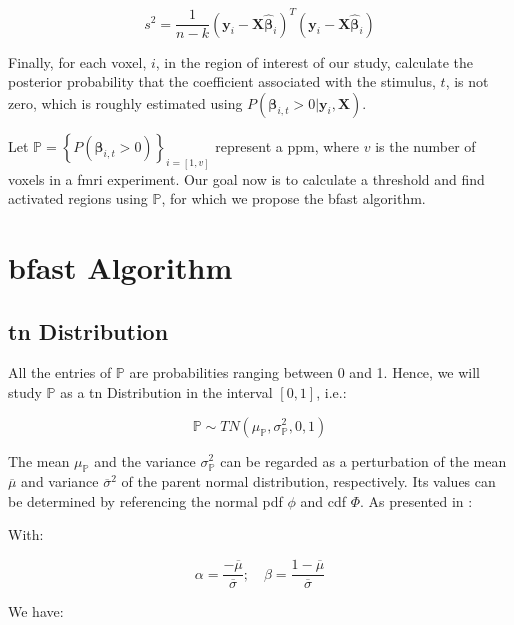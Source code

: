 \begin{equation}
s^2 = \frac{1}{n-k} \left( \bm{y}_i - \bm{X}\bm{\hat{\beta}}_i \right)^T \left( \bm{y}_i - \bm{X}\bm{\hat{\beta}}_i \right)
\end{equation}

Finally, for each voxel, $i$, in the region of interest of our study, calculate the posterior probability that the coefficient associated with the stimulus, $t$, is not zero, which is roughly estimated using $P(\bm{\beta}_{i,t} > 0 | \bm{y}_i, \bm{X})$.

Let $\bm{\mathbb{P}} = \left\{ P(\bm{\beta}_{i,t} > 0 ) \right\}_{i=[1,v]}$ represent a \gls{ppm}, where $v$ is the number of voxels in a \gls{fmri} experiment. Our goal now is to calculate a threshold and find activated regions using $\bm{\mathbb{P}}$, for which we propose the \gls{bfast} algorithm.

\section{\gls{bfast} Algorithm}

\subsection{\gls{tn} Distribution}

All the entries of $\bm{\mathbb{P}}$ are probabilities ranging between 0 and 1. Hence, we will study $\bm{\mathbb{P}}$ as a \gls{tn} Distribution in the interval $[0,1]$, i.e.:

\begin{equation}
\bm{\mathbb{P}} \sim TN\left( \mu_{\bm{\mathbb{P}}}, \sigma^2_{\bm{\mathbb{P}}}, 0,1 \right)
\end{equation}

The mean $\mu_{\bm{\mathbb{P}}}$ and the variance $\sigma^2_{\bm{\mathbb{P}}}$ can be regarded as a perturbation of the mean $\overline{\mu}$ and variance $\overline{\sigma}^2$ of the parent normal distribution, respectively. Its values can be determined by referencing the normal \gls{pdf} $\phi$ and \gls{cdf} $\Phi$. As presented in \cite{johnson1995continuous}:

With:

\begin{equation}
\alpha = \frac{-\overline{\mu}}{\overline{\sigma}}; \quad \beta = \frac{1-\overline{\mu}}{\overline{\sigma}}
\label{eq:alpha_beta}
\end{equation}

We have:

